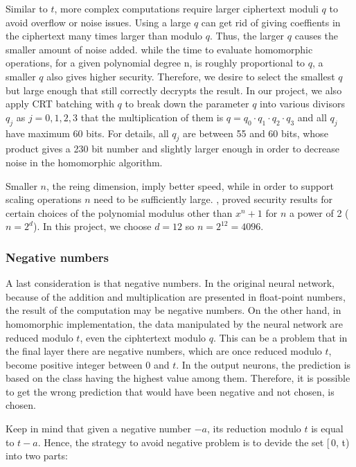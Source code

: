 \documentclass[A4paper,12pt]{article}
\begin{document}
Similar to $t$, more complex computations require larger ciphertext moduli $q$ to avoid overflow or noise issues. Using a large $q$ can get rid of giving coeffients in the ciphertext many times larger than modulo $q$. Thus, the larger $q$ causes the smaller amount of noise added. while the time to evaluate homomorphic operations, for a given polynomial degree n, is roughly proportional to $q$, a smaller $q$ also gives higher security. Therefore, we desire to select the smallest $q$ but large enough that still correctly decrypts the result. In our project, we also apply CRT batching with $q$ to break down the parameter $q$ into various divisors $q_j$ as $j = 0,1,2,3$ that the multiplication of them is $q = q_0 \cdot q_1 \cdot q_2 \cdot q_3$ and all $q_j$ have maximum 60 bits. For details, all $q_j$ are between 55 and 60 bits, whose product gives a 230 bit number and slightly larger enough in order to  decrease noise in the homomorphic algorithm.

Smaller $n$, the reing dimension, imply better speed, while in order to support scaling operations $n$ need to be sufficiently large. \cite{npowe2_1}, \cite{npowe2_2} proved security results for certain choices of the polynomial modulus other than $x^n + 1$ for $n$ a power of 2 ($n = 2^d$). In this project, we choose $d = 12$ so $n = 2^{12} = 4096$.

	\subsubsection{Negative numbers}

A last consideration is that negative numbers. In the original neural network, because of the addition and multiplication are presented in float-point numbers, the result of the computation may be negative numbers. On the other hand, in homomorphic implementation, the data manipulated by the neural network are reduced modulo $t$, even the ciphtertext modulo $q$. This can be a problem that in the final layer there are negative numbers, which are once reduced modulo $t$, become positive integer between 0 and $t$. In the output neurons, the prediction is based on the class having the highest value among them. Therefore, it is possible to get the wrong prediction that would have been negative and not chosen, is chosen.

Keep in mind that given a negative number $-a$, its reduction modulo $t$ is equal to $t - a$. Hence, the strategy to avoid negative problem is to devide the set [\,0, t)\, into two parts: 
\end{document}
